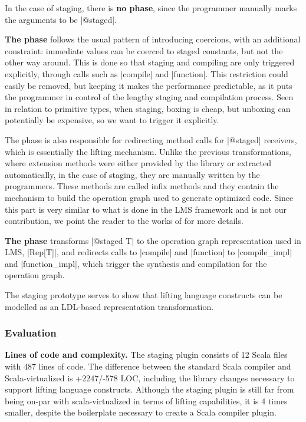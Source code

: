 In the case of staging, there is \textbf{no \inject{} phase}, since the programmer manually marks the arguments to be |@staged|.

\textbf{The \coerce{} phase} follows the usual pattern of introducing coercions, with an additional constraint: immediate values can be coerced to staged constants, but not the other way around. This is done so that staging and compiling are only triggered explicitly, through calls such as |compile| and |function|. This restriction could easily be removed, but keeping it makes the performance predictable, as it puts the programmer in control of the lengthy staging and compilation process. Seen in relation to primitive types, when staging, boxing is cheap, but unboxing can potentially be expensive, so we want to trigger it explicitly.

The \coerce{} phase is also responsible for redirecting method calls for |@staged| receivers, which is essentially the lifting mechanism. Unlike the previous transformations, where extension methods were either provided by the library or extracted automatically, in the case of staging, they are manually written by the programmers. These methods are called infix methods \cite{scala-virtualized} and they contain the mechanism to build the operation graph used to generate optimized code. Since this part is very similar to what is done in the LMS framework and is not our contribution, we point the reader to the works of  \cite{tiark-lms, tiark-building-blocks, tiark-thesis} for more details.

\textbf{The \commit{} phase} transforms |@staged T| to the operation graph representation used in LMS, |Rep[T]|, and redirects calls to |compile| and |function| to |compile_impl| and |function_impl|, which trigger the synthesis and compilation for the operation graph.

The staging prototype serves to show that lifting language constructs can be modelled as an LDL-based representation transformation.

\subsubsection{Evaluation}

\textbf{Lines of code and complexity.} The staging plugin consists of 12 Scala files with 487 lines of code. The difference between the standard Scala compiler and Scala-virtualized is +2247/-578 LOC, including the library changes necessary to support lifting language constructs. Although the staging plugin is still far from being on-par with scala-virtualized in terms of lifting capabilities, it is 4 times smaller, despite the boilerplate necessary to create a Scala compiler plugin.

